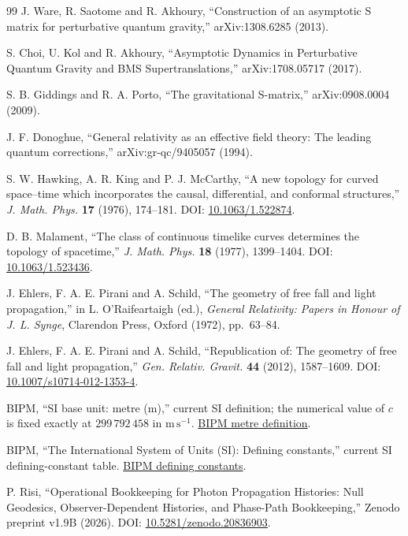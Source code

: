 \documentclass[11pt,a4paper]{article}
\begin{document}
\begin{thebibliography}{99}
J. Ware, R. Saotome and R. Akhoury, ``Construction of an asymptotic S matrix for perturbative quantum gravity,'' arXiv:1308.6285 (2013).

S. Choi, U. Kol and R. Akhoury, ``Asymptotic Dynamics in Perturbative Quantum Gravity and BMS Supertranslations,'' arXiv:1708.05717 (2017).

S. B. Giddings and R. A. Porto, ``The gravitational S-matrix,'' arXiv:0908.0004 (2009).

J. F. Donoghue, ``General relativity as an effective field theory: The leading quantum corrections,'' arXiv:gr-qc/9405057 (1994).

S. W. Hawking, A. R. King and P. J. McCarthy, ``A new topology for curved space--time which incorporates the causal, differential, and conformal structures,'' \emph{J. Math. Phys.} \textbf{17} (1976), 174--181. DOI: \href{https://doi.org/10.1063/1.522874}{10.1063/1.522874}.

D. B. Malament, ``The class of continuous timelike curves determines the topology of spacetime,'' \emph{J. Math. Phys.} \textbf{18} (1977), 1399--1404. DOI: \href{https://doi.org/10.1063/1.523436}{10.1063/1.523436}.

J. Ehlers, F. A. E. Pirani and A. Schild, ``The geometry of free fall and light propagation,'' in L. O'Raifeartaigh (ed.), \emph{General Relativity: Papers in Honour of J. L. Synge}, Clarendon Press, Oxford (1972), pp.~63--84.

J. Ehlers, F. A. E. Pirani and A. Schild, ``Republication of: The geometry of free fall and light propagation,'' \emph{Gen. Relativ. Gravit.} \textbf{44} (2012), 1587--1609. DOI: \href{https://doi.org/10.1007/s10714-012-1353-4}{10.1007/s10714-012-1353-4}.

BIPM, ``SI base unit: metre (m),'' current SI definition; the numerical value of $c$ is fixed exactly at $299\,792\,458$ in $\mathrm{m\,s^{-1}}$. \href{https://www.bipm.org/en/si-base-units/metre}{BIPM metre definition}.

BIPM, ``The International System of Units (SI): Defining constants,'' current SI defining-constant table. \href{https://www.bipm.org/en/measurement-units/si-defining-constants}{BIPM defining constants}.

P. Risi, ``Operational Bookkeeping for Photon Propagation Histories: Null Geodesics, Observer-Dependent Histories, and Phase-Path Bookkeeping,'' Zenodo preprint v1.9B (2026). DOI: \href{https://doi.org/10.5281/zenodo.20836903}{10.5281/zenodo.20836903}.

\end{thebibliography}
\end{document}
